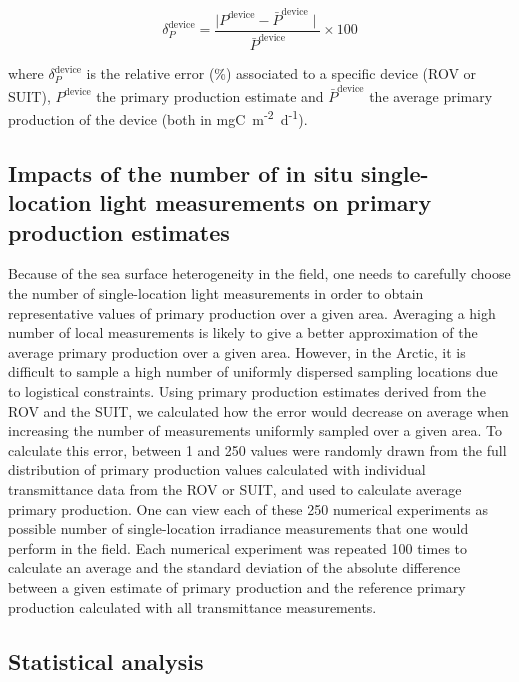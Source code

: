 \documentclass[draft]{agujournal2018}
\newcommand{\dailypp}{mgC~m\textsuperscript{-2}~d\textsuperscript{-1}}
\begin{document}
\begin{linenomath*}
    \begin{equation}
		\delta_P^{\text{device}} = \frac{\mid P^{\text{device}} - \bar{P}^{\text{device}} \mid}{\bar{P}^{\text{device}}} \times 100
	\end{equation}
\end{linenomath*}

where $\delta_P^{\text{device}}$ is the relative error (\%) associated to a specific device (ROV or SUIT), $P^{\text{device}}$ the primary production estimate and $\bar{P}^{\text{device}}$ the average primary production of the device (both in \dailypp{}).

\subsection{Impacts of the number of in situ single-location light  measurements on primary production estimates}

Because of the sea surface heterogeneity in the field, one needs to carefully choose the number of single-location light measurements in order to obtain representative values of primary production over a given area. Averaging a high number of local measurements is likely to give a better approximation of the average primary production over a given area. However, in the Arctic, it is difficult to sample a high number of uniformly dispersed sampling locations due to logistical constraints. Using primary production estimates derived from the ROV and the SUIT, we calculated how the error would decrease on average when increasing the number of measurements uniformly sampled over a given area. To calculate this error, between 1 and 250 values were randomly drawn from the full distribution of primary production values calculated with individual transmittance data from the ROV or SUIT, and used to calculate average primary production. One can view each of these 250 numerical experiments as possible number of single-location irradiance  measurements that one would perform in the field. Each numerical experiment was repeated 100 times to calculate an average and the standard deviation of the absolute difference between a given estimate of primary production and the reference primary production calculated with all transmittance measurements.

\subsection{Statistical analysis}
\end{document}
